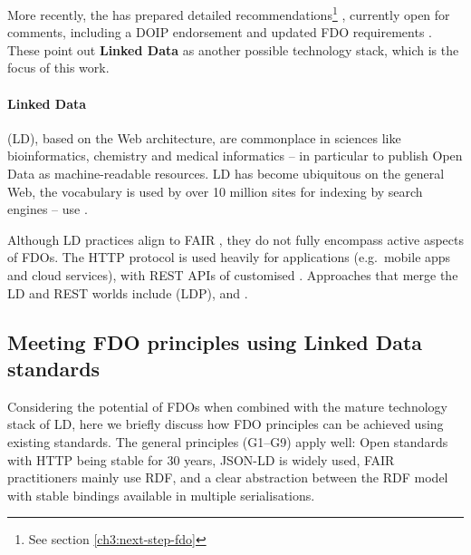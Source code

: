 More recently, the  has prepared 
detailed recommendations\footnote{See section \vref{ch3:next-step-fdo}} \cite{fdo-Specs},
currently open for comments, including a
DOIP endorsement \cite{fdo-DOIPEndorsement} and updated
FDO requirements \cite{fdo-RequirementSpec}. These point out \textbf{Linked Data} as another possible
technology stack, which is the focus of this work.

\paragraph{Linked Data}
\label{ch2:linked-data}

 (LD), based on the Web architecture, are commonplace in
sciences like bioinformatics, chemistry and medical informatics -- in
particular to publish Open Data as machine-readable resources. LD has
become ubiquitous on the general Web, the
 vocabulary is used by over 10
million sites for indexing by search engines --
 use .

Although LD practices align to FAIR \cite{Hasnain 2018},
they do not fully encompass active aspects of FDOs. The HTTP protocol is
used heavily for applications (e.g.~mobile apps and cloud services),
with REST APIs of customised . Approaches that merge the LD and REST worlds include
 (LDP),
 and
.


\subsection{Meeting FDO principles using Linked Data
standards}\label{ch2:meeting-fdo-principles-using-linked-data-standards}

Considering the potential of FDOs when combined with the mature
technology stack of LD, here we briefly discuss how FDO principles can
be achieved using existing standards. The general principles (G1--G9)
apply well: Open standards with HTTP being stable for 30 years, JSON-LD
is widely used, FAIR practitioners mainly use RDF, and a clear
abstraction between the RDF model with stable bindings available in
multiple serialisations.

